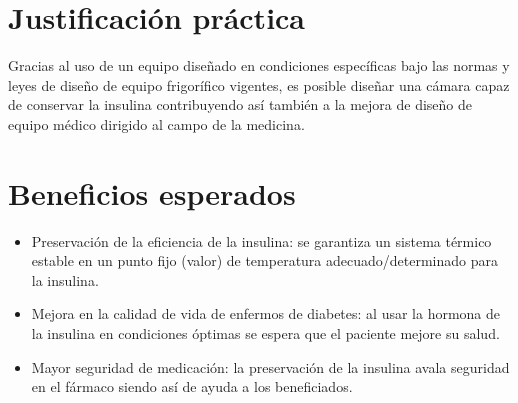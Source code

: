  
\section*{Justificación práctica}
Gracias al uso de un equipo diseñado en condiciones específicas bajo las normas y leyes de diseño de equipo frigorífico vigentes, es posible diseñar una cámara capaz de conservar la insulina contribuyendo así también a la mejora de diseño de equipo médico dirigido al campo de la medicina.  

\newpage
\section*{Beneficios esperados}
\begin{itemize}
	\item	Preservación de la eficiencia de la insulina: se garantiza un sistema térmico estable en un punto fijo (valor) de temperatura adecuado/determinado para la insulina. 
	\item 	Mejora en la calidad de vida de enfermos de diabetes: al usar la hormona de la insulina en condiciones óptimas se espera que el paciente mejore su salud.
	\item Mayor seguridad de medicación: la preservación de la insulina avala seguridad en el fármaco siendo así de ayuda a los beneficiados.
	
\end{itemize}



 
